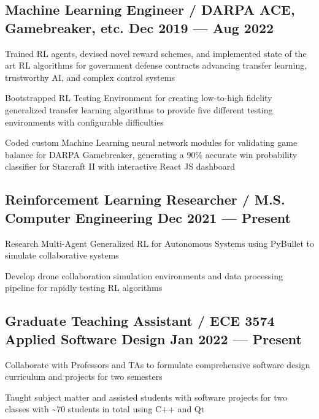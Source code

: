 \subsection{{Machine Learning Engineer / DARPA ACE, Gamebreaker, etc. \hfill Dec 2019 --- Aug 2022}}
\begin{zitemize}
	\item Trained RL agents, devised novel reward schemes, and implemented state of the art RL algorithms for government defense contracts advancing transfer learning, trustworthy AI, and complex
	control systems
	\item Bootstrapped RL Testing Environment for creating low-to-high fidelity generalized transfer learning algorithms
	to provide five different testing environments with configurable difficulties
	\item Coded custom Machine Learning neural network modules for validating game balance for DARPA Gamebreaker, generating a 90\%
	accurate win probability classifier for Starcraft II with interactive React JS dashboard
\end{zitemize}

\subsection{{Reinforcement Learning Researcher / M.S. Computer Engineering  \hfill Dec 2021 --- Present}}
\begin{zitemize}
	\item Research Multi-Agent Generalized RL for Autonomous Systems using PyBullet to simulate
	collaborative systems
	\item Develop drone collaboration simulation environments and data processing pipeline for rapidly testing RL algorithms
\end{zitemize}

\subsection{{Graduate Teaching Assistant / ECE 3574 Applied Software Design  \hfill Jan 2022 --- Present}}
\begin{zitemize}
	\item Collaborate with Professors and TAs to formulate comprehensive software design curriculum and projects for two
	semesters
	\item Taught subject matter and assisted students with software projects for two classes with \textasciitilde 70 students in
	total using C++ and Qt
\end{zitemize}

